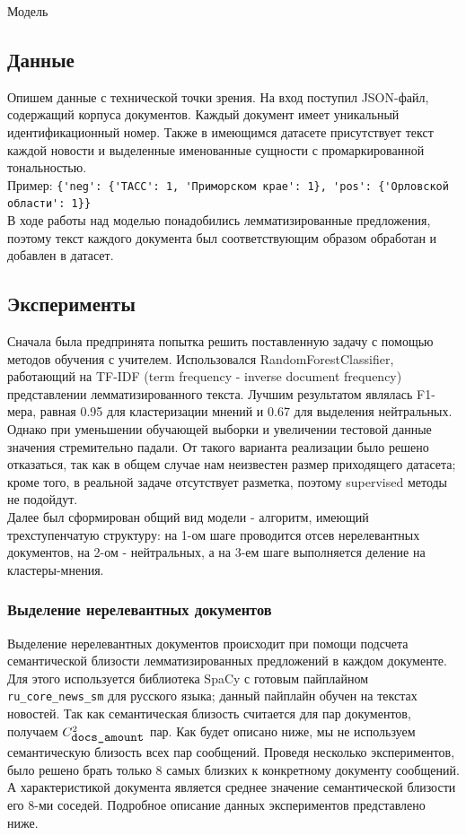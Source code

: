\documentclass{article}
\begin{document}
\begin{section}{Модель}
\label{sentiment}
\subsection{Данные}
Опишем данные с технической точки зрения. На вход поступил JSON-файл, содержащий корпуса документов. Каждый документ имеет уникальный идентификационный номер. Также в имеющимся датасете присутствует текст каждой новости и выделенные именованные сущности с промаркированной тональностью.\\
Пример:  \verb|{'neg': {'ТАСС': 1, 'Приморском крае': 1}, 'pos': {'Орловской области': 1}}|\\

В ходе работы над моделью понадобились лемматизированные предложения, поэтому текст каждого документа был соответствующим образом обработан и добавлен в датасет.
\subsection{Эксперименты}
Сначала была предпринята попытка решить поставленную задачу с помощью методов обучения с учителем. Использовался RandomForestClassifier, работающий на TF-IDF (term frequency - inverse document frequency) представлении лемматизированного текста. Лучшим результатом являлась F1-мера, равная 0.95 для кластеризации мнений и 0.67 для выделения нейтральных. Однако при уменьшении обучающей выборки и увеличении тестовой данные значения стремительно падали. От такого варианта реализации было решено отказаться, так как в общем случае нам неизвестен размер приходящего датасета; кроме того, в реальной задаче отсутствует разметка, поэтому supervised методы не подойдут.\\

Далее был сформирован общий вид модели - алгоритм, имеющий трехступенчатую структуру: на 1-ом шаге проводится отсев нерелевантных документов, на 2-ом - нейтральных, а на 3-ем шаге выполняется деление на кластеры-мнения.\\

\subsubsection{Выделение нерелевантных документов}
Выделение нерелевантных документов происходит при помощи подсчета семантической близости лемматизированных предложений в каждом документе. Для этого используется библиотека SpaCy с готовым пайплайном \verb|ru_core_news_sm| для русского языка; данный пайплайн обучен на текстах новостей. Так как семантическая близость считается для пар документов, получаем $C_{\verb|docs_amount|}^2$ пар. Как будет описано ниже, мы не используем семантическую близость всех пар сообщений. Проведя несколько экспериментов, было решено брать только 8 самых близких к конкретному документу сообщений. А характеристикой документа является среднее значение семантической близости его 8-ми соседей. Подробное описание данных экспериментов представлено ниже.\\


\end{section}
\end{document}
